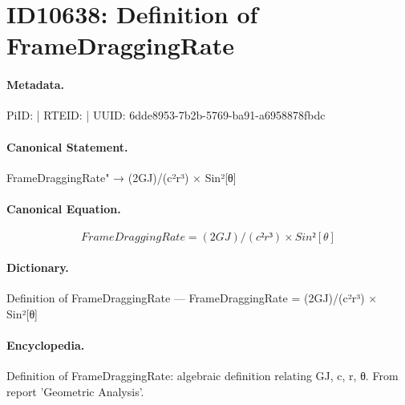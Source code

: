 \section*{ID10638: Definition of FrameDraggingRate}
\paragraph{Metadata.}
PiID:  | RTEID:  | UUID: 6dde8953-7b2b-5769-ba91-a6958878fbdc

\paragraph{Canonical Statement.}
FrameDraggingRate" → (2GJ)/(c²r³) × Sin²[θ]

\paragraph{Canonical Equation.}
\[
FrameDraggingRate = (2GJ)/(c²r³) × Sin²[θ]
\]

\paragraph{Dictionary.}
Definition of FrameDraggingRate — FrameDraggingRate = (2GJ)/(c²r³) × Sin²[θ]

\paragraph{Encyclopedia.}
Definition of FrameDraggingRate: algebraic definition relating GJ, c, r, θ. From report 'Geometric Analysis'.
